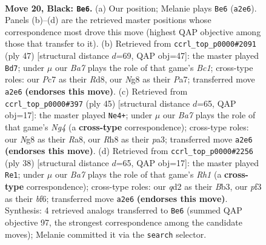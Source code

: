 \documentclass[11pt]{article}
\begin{document}
\clearpage

\begin{figure}[p]\centering
\begin{subfigure}{0.46\textwidth}\centering
\resizebox{\linewidth}{!}{%
\newchessgame
\chessboard[
  setfen={2k3nr/p1p1qppp/1p6/2p5/4B3/2P2P2/bP1Q2PP/2K1R3 b - - 3 20},
  showmover=false,
  pgfstyle=straightmove, color=movearrow, markmove={a2-e6}
]}
\caption{}
\end{subfigure}\hfill
\begin{subfigure}{0.46\textwidth}\centering
\resizebox{\linewidth}{!}{%
\newchessgame
\chessboard[
  setfen={2br2k1/p4p1p/1qpp2p1/8/7P/1BQ2PP1/PPP5/2K1R3 b - - 0 24},
  showmover=false,
  pgfstyle=straightmove, color=movearrow, markmove={c8-d7}
]}
\caption{}
\end{subfigure}
\\[4pt]
\begin{subfigure}{0.46\textwidth}\centering
\resizebox{\linewidth}{!}{%
\newchessgame
\chessboard[
  setfen={r3q1k1/p4pp1/1p5p/3p2n1/3P2P1/P5BP/1P2QKP1/2R4R b - - 4 23},
  showmover=false,
  pgfstyle=straightmove, color=movearrow, markmove={g5-e4}
]}
\caption{}
\end{subfigure}\hfill
\begin{subfigure}{0.46\textwidth}\centering
\resizebox{\linewidth}{!}{%
\newchessgame
\chessboard[
  setfen={3r2k1/p3qppp/1p3b2/8/7P/1B4P1/PPP1QP2/2K4R w - - 3 20},
  showmover=false,
  pgfstyle=straightmove, color=movearrow, markmove={h1-e1}
]}
\caption{}
\end{subfigure}
\caption{\textbf{Move 20, Black: \texttt{Be6}.} (a) Our position; Melanie plays \texttt{Be6} (\texttt{a2e6}). Panels (b)--(d) are the retrieved master positions whose correspondence most drove this move (highest QAP objective among those that transfer to it). (b) Retrieved from \texttt{ccrl\_top\_p0000\#2091} (ply 47) [structural distance $d$=69, QAP obj=47]: the master played \texttt{Bd7}; under $\mu$ our \emph{Ba7} plays the role of that game's \emph{Bc1}; cross-type roles: our \emph{P}c7 as their \emph{R}d8, our \emph{N}g8 as their \emph{P}a7; transferred move \texttt{a2e6} \textbf{(endorses this move)}. (c) Retrieved from \texttt{ccrl\_top\_p0000\#397} (ply 45) [structural distance $d$=65, QAP obj=17]: the master played \texttt{Ne4+}; under $\mu$ our \emph{Ba7} plays the role of that game's \emph{Ng4} (a \textbf{cross-type} correspondence); cross-type roles: our \emph{N}g8 as their \emph{R}a8, our \emph{R}h8 as their \emph{p}a3; transferred move \texttt{a2e6} \textbf{(endorses this move)}. (d) Retrieved from \texttt{ccrl\_top\_p0000\#2256} (ply 38) [structural distance $d$=65, QAP obj=17]: the master played \texttt{Re1}; under $\mu$ our \emph{Ba7} plays the role of that game's \emph{Rh1} (a \textbf{cross-type} correspondence); cross-type roles: our \emph{q}d2 as their \emph{B}b3, our \emph{p}f3 as their \emph{b}f6; transferred move \texttt{a2e6} \textbf{(endorses this move)}. Synthesis: 4 retrieved analogs transferred to \texttt{Be6} (summed QAP objective 97, the strongest correspondence among the candidate moves); Melanie committed it via the \texttt{search} selector.}
\label{fig:thought-m39}
\end{figure}
\end{document}
